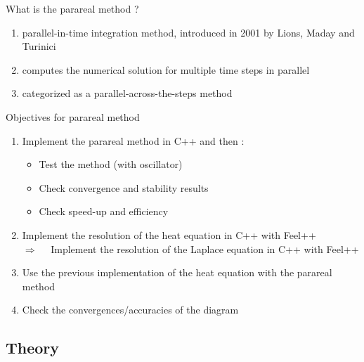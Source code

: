 \begin{frame}{What is the parareal method ?}
	
	\begin{enumerate}[\textbullet]
		\item parallel-in-time integration method, introduced in 2001 by Lions, Maday and Turinici
		\item computes the numerical solution for multiple time steps in parallel
		\item categorized as a parallel-across-the-steps method 
	\end{enumerate}

\end{frame}

\begin{frame}{Objectives for parareal method}
	
	\begin{enumerate}[\textbullet]
		\item Implement the parareal method in C++ and then :
		\begin{itemize}
			\item Test the method (with oscillator)
			\item Check convergence and stability results
			\item Check speed-up and efficiency 
		\end{itemize}
		\item Implement the resolution of the heat equation in C++ with Feel++ \\
		$\Rightarrow \quad $ Implement the resolution of the Laplace equation in C++ with Feel++ \\
		\item Use the previous implementation of the heat equation with the parareal method
		\item Check the convergences/accuracies of the diagram
	\end{enumerate}
	
\end{frame}


\subsection{Theory}

